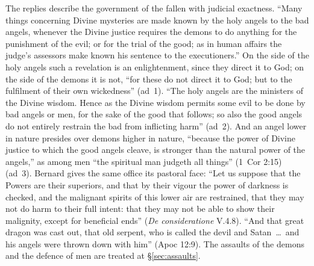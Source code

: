 The replies describe the government of the fallen with judicial exactness.
``Many things concerning Divine mysteries are made known by the holy angels to
the bad angels, whenever the Divine justice requires the demons to do anything
for the punishment of the evil; or for the trial of the good; as in human
affairs the judge's assessors make known his sentence to the executioners.''
On the side of the holy angels such a revelation is an enlightenment, since
they direct it to God; on the side of the demons it is not, ``for these do not
direct it to God; but to the fulfilment of their own wickedness'' (ad~1).
``The holy angels are the ministers of the Divine wisdom. Hence as the Divine
wisdom permits some evil to be done by bad angels or men, for the sake of the
good that follows; so also the good angels do not entirely restrain the bad
from inflicting harm'' (ad~2). And an angel lower in nature presides over
demons higher in nature, ``because the power of Divine justice to which the
good angels cleave, is stronger than the natural power of the angels,'' as
among men ``the spiritual man judgeth all things'' (1~Cor 2:15) (ad~3).
Bernard gives the same office its pastoral face: ``Let us suppose that the
Powers are their superiors, and that by their vigour the power of darkness is
checked, and the malignant spirits of this lower air are restrained, that
they may not do harm to their full intent: that they may not be able to show
their malignity, except for beneficial ends'' (\emph{De consideratione}
V.4.8). ``And that great dragon was cast out, that old serpent, who is called
the devil and Satan~\dots\ and his angels were thrown down with him'' (Apoc
12:9). The assaults of the demons and the defence of men are treated at
\S\ref{sec:assaults}.

